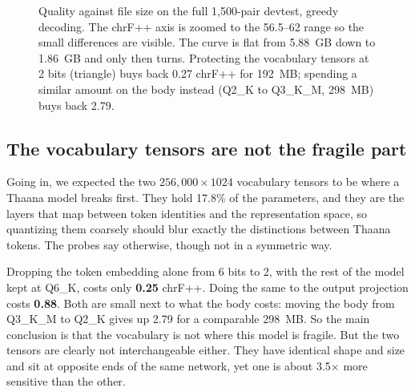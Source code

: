 \documentclass[10pt,twocolumn]{article}
\begin{document}
\begin{figure}[t]
\centering
{}
\caption{Quality against file size on the full 1{,}500-pair devtest,
greedy decoding. The chrF++ axis is zoomed to the 56.5--62 range so the
small differences are visible. The curve is flat from 5.88~GB down to
1.86~GB and only then turns. Protecting the vocabulary tensors at 2 bits
(triangle) buys back 0.27 chrF++ for 192~MB; spending a similar amount on
the body instead (Q2\_K to Q3\_K\_M, 298~MB) buys back 2.79.}
\label{fig:curve}
\end{figure}

\subsection{The vocabulary tensors are not the fragile part}
\label{sec:vocab}

Going in, we expected the two $256{,}000 \times 1024$ vocabulary tensors
to be where a Thaana model breaks first. They hold 17.8\% of the
parameters, and they are the layers that map between token identities and
the representation space, so quantizing them coarsely should blur exactly
the distinctions between Thaana tokens. The probes say otherwise, though
not in a symmetric way.

Dropping the token embedding alone from 6 bits to 2, with the rest of the
model kept at Q6\_K, costs only \textbf{0.25} chrF++. Doing the same to
the output projection costs \textbf{0.88}. Both are small next to what
the body costs: moving the body from Q3\_K\_M to Q2\_K gives up 2.79 for
a comparable 298~MB. So the main conclusion is that the vocabulary is not
where this model is fragile. But the two tensors are clearly not
interchangeable either. They have identical shape and size and sit at
opposite ends of the same network, yet one is about 3.5$\times$ more
sensitive than the other.
\end{document}
